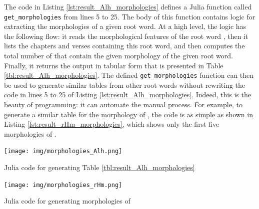 The code in Listing \ref{lst:result_Alh_morphologies} defines a Julia function called \verb|get_morphologies| from lines 5 to 25. The body of this function contains logic for extracting the morphologies of a given root word. At a high level, the logic has the following flow: it reads the morphological features of the root word , then it lists the chapters and verses containing this root word, and then computes the total number of   that contain the given morphology of the given root word. Finally, it returns the output in tabular form that is presented in Table \ref{tbl:result_Alh_morphologies}. The defined \verb|get_morphologies| function can then be used to generate similar tables from other root words without rewriting the code in lines 5 to 25 of Listing \ref{lst:result_Alh_morphologies}. Indeed, this is the beauty of programming: it can automate the manual process. For example, to generate a similar table for the morphology of , the code is as simple as shown in Listing \ref{lst:result_rHm_morphologies}, which shows only the first five morphologies of .

\begin{listing2}[!t]
    \centering
    \texttt{[image: img/morphologies\_Alh.png]}
    \caption{Julia code for generating Table \ref{tbl:result_Alh_morphologies}}
    \label{lst:result_Alh_morphologies}
\end{listing2}

\begin{listing2}[!t]
    \centering
    \texttt{[image: img/morphologies\_rHm.png]}
    \caption{Julia code for generating morphologies of }
    \label{lst:result_rHm_morphologies}
\end{listing2}

